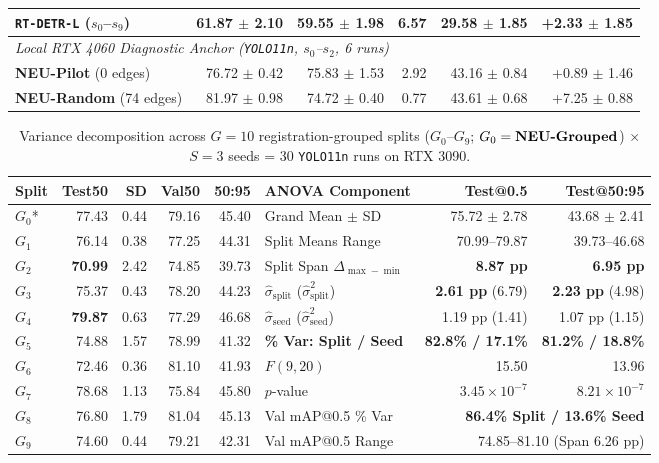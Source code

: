 \documentclass[pdflatex,sn-apa]{sn-jnl}
\begin{document}
\begin{table}[htbp]
\begin{tabular*}{\textwidth}{@{\extracolsep{\fill}} l r r r r r}
\texttt{RT-DETR-L} ($s_0$--$s_9$) & 61.87 $\pm$ 2.10 & 59.55 $\pm$ 1.98 & \textbf{6.57} & 29.58 $\pm$ 1.85 & +2.33 $\pm$ 1.85 \\
\midrule
\multicolumn{6}{l}{\textit{Local RTX 4060 Diagnostic Anchor (\texttt{YOLO11n}, $s_0$--$s_2$, 6 runs)}} \\
\textbf{NEU-Pilot} (0 edges) & 76.72 $\pm$ 0.42 & 75.83 $\pm$ 1.53 & 2.92 & 43.16 $\pm$ 0.84 & +0.89 $\pm$ 1.46 \\
\textbf{NEU-Random} (74 edges) & 81.97 $\pm$ 0.98 & 74.72 $\pm$ 0.40 & 0.77 & 43.61 $\pm$ 0.68 & +7.25 $\pm$ 0.88 \\
\bottomrule
\end{tabular*}
\end{table}

\begin{table}[htbp]
\centering
\footnotesize
\setlength{\tabcolsep}{2.5pt}
\caption{Variance decomposition across $G=10$ registration-grouped splits ($G_0$--$G_9$; $G_0 = \text{\textbf{NEU-Grouped}}$) $\times$ $S=3$ seeds = 30 \texttt{YOLO11n} runs on RTX 3090.}
\label{tab:e2_anova}
\begin{tabularx}{\textwidth}{l r r r r | >{\raggedright\arraybackslash}X r r}
\toprule
\textbf{Split} & \textbf{Test50} & \textbf{SD} & \textbf{Val50} & \textbf{50:95} & \textbf{ANOVA Component} & \textbf{Test@0.5} & \textbf{Test@50:95} \\
\midrule
$G_0$* & 77.43 & 0.44 & 79.16 & 45.40 & Grand Mean $\pm$ SD & 75.72 $\pm$ 2.78 & 43.68 $\pm$ 2.41 \\
$G_1$ & 76.14 & 0.38 & 77.25 & 44.31 & Split Means Range & 70.99--79.87 & 39.73--46.68 \\
$G_2$ & \textbf{70.99} & 2.42 & 74.85 & 39.73 & Split Span $\Delta_{\max-\min}$ & \textbf{8.87 pp} & \textbf{6.95 pp} \\
$G_3$ & 75.37 & 0.43 & 78.20 & 44.23 & $\hat{\sigma}_{\text{split}}$ ($\hat{\sigma}^2_{\text{split}}$) & \textbf{2.61 pp} (6.79) & \textbf{2.23 pp} (4.98) \\
$G_4$ & \textbf{79.87} & 0.63 & 77.29 & 46.68 & $\hat{\sigma}_{\text{seed}}$ ($\hat{\sigma}^2_{\text{seed}}$) & 1.19 pp (1.41) & 1.07 pp (1.15) \\
$G_5$ & 74.88 & 1.57 & 78.99 & 41.32 & \textbf{\% Var: Split / Seed} & \textbf{82.8\% / 17.1\%} & \textbf{81.2\% / 18.8\%} \\
$G_6$ & 72.46 & 0.36 & 81.10 & 41.93 & $F(9,20)$ & 15.50 & 13.96 \\
$G_7$ & 78.68 & 1.13 & 75.84 & 45.80 & $p$-value & $3.45\times 10^{-7}$ & $8.21\times 10^{-7}$ \\
$G_8$ & 76.80 & 1.79 & 81.04 & 45.13 & Val mAP@0.5 \% Var & \multicolumn{2}{r}{\textbf{86.4\% Split / 13.6\% Seed}} \\
$G_9$ & 74.60 & 0.44 & 79.21 & 42.31 & Val mAP@0.5 Range & \multicolumn{2}{r}{74.85--81.10 (Span 6.26 pp)} \\
\bottomrule
\end{tabularx}
\end{table}
\end{document}
